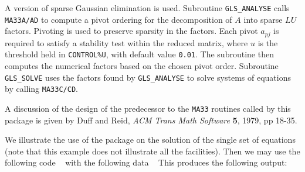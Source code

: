 \documentclass{galahad}
\newcommand{\packagename}{GLS}
\begin{document}

\galmethod

A version of sparse Gaussian elimination is used.
Subroutine {\tt \packagename\_ANALYSE} calls {\tt MA33A/AD}
to compute a pivot ordering for the decomposition of {$A$} into 
sparse $LU$ factors. Pivoting is used to preserve sparsity in the 
factors. Each pivot $a_{pj}$ is required to satisfy a stability test
\noindent within the reduced matrix, where $u$ is the threshold held in
{\tt CONTROL\%U}, with default value {\tt 0.01}.  The subroutine 
then computes the numerical factors based on the chosen pivot order.
Subroutine {\tt \packagename\_SOLVE} uses the factors found by 
{\tt \packagename\_ANALYSE} to solve systems of equations by 
calling {\tt MA33C/CD}.

A discussion of the design of the predecessor to the {\tt MA33} routines 
called by this package is given by 
Duff and Reid, {\it ACM Trans Math Software} {\bf 5},  1979, pp 18-35.



\galexample

We illustrate the use of the package on the solution of the 
single set of equations 
(note that this example does not illustrate all the facilities). 
Then we may use the following code
{\tt \small
\VerbatimInput{\packageexample}
}
\noindent
with the following data
{\tt \small
\VerbatimInput{\packagedata}
}
\noindent
This produces the following output:
{\tt \small
\VerbatimInput{\packageresults}
}
\noindent
\end{document}
